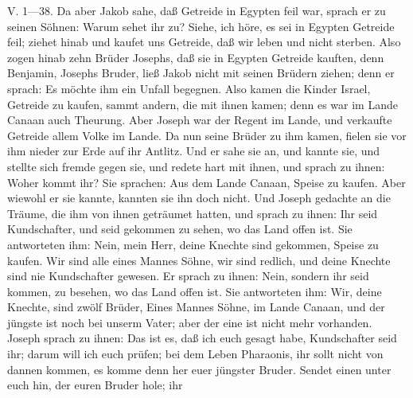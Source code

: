 \begin{schriftzitat}
V. 1—38. Da aber Jakob sahe, daß Getreide in Egypten feil war, sprach er zu seinen Söhnen: Warum sehet ihr zu? Siehe, ich höre, es sei in Egypten Getreide feil; ziehet hinab und kaufet uns Getreide, daß wir leben und nicht sterben. Also zogen hinab zehn Brüder Josephs, daß sie in Egypten Getreide kauften, denn Benjamin, Josephs Bruder, ließ Jakob nicht mit seinen Brüdern ziehen; denn er sprach: Es möchte ihm ein Unfall begegnen. Also kamen die Kinder Israel, Getreide zu kaufen, sammt andern, die mit ihnen kamen; denn es war im Lande Canaan auch Theurung. Aber Joseph war der Regent im Lande, und verkaufte Getreide allem Volke im Lande. Da nun seine Brüder zu ihm kamen, fielen sie vor ihm nieder zur Erde auf ihr Antlitz. Und er sahe sie an, und kannte sie, und stellte sich fremde gegen sie, und redete hart mit ihnen, und sprach zu ihnen: Woher kommt ihr? Sie sprachen: Aus dem Lande Canaan, Speise zu kaufen. Aber wiewohl er sie kannte, kannten sie ihn doch nicht. Und Joseph gedachte an die Träume, die ihm von ihnen geträumet hatten, und sprach zu ihnen: Ihr seid Kundschafter, und seid gekommen zu sehen, wo das Land offen ist. Sie antworteten ihm: Nein, mein Herr, deine Knechte sind gekommen, Speise zu kaufen. Wir sind alle eines Mannes Söhne, wir sind redlich, und deine Knechte sind nie Kundschafter gewesen. Er sprach zu ihnen: Nein, sondern ihr seid kommen, zu besehen, wo das Land offen ist. Sie antworteten ihm: Wir, deine Knechte, sind zwölf Brüder, Eines Mannes Söhne, im Lande Canaan, und der jüngste ist noch bei unserm Vater; aber der eine ist nicht mehr vorhanden. Joseph sprach zu ihnen: Das ist es, daß ich euch gesagt habe, Kundschafter seid ihr; darum will ich euch prüfen; bei dem Leben Pharaonis, ihr sollt nicht von dannen kommen, es komme denn her euer jüngster Bruder. Sendet einen unter euch hin, der euren Bruder hole; ihr

\end{schriftzitat}
